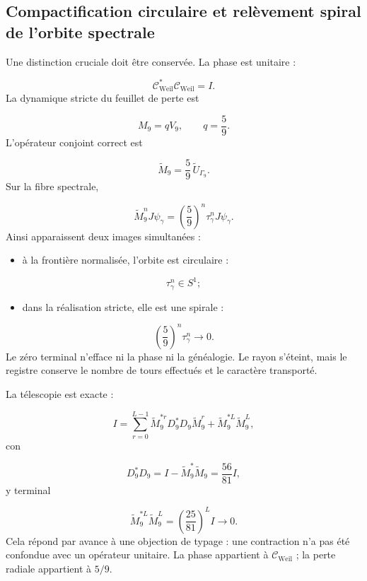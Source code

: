 \subsection{Compactification circulaire et relèvement spiral de l'orbite spectrale}
Une distinction cruciale doit être conservée. La phase est unitaire :\par
\[
\mathcal C_{\mathrm{Weil}}^*
\mathcal C_{\mathrm{Weil}}=I.
\]
La dynamique stricte du feuillet de perte est\par
\[
M_9=qV_9,
\qquad
q=\frac59.
\]
L'opérateur conjoint correct est\par
\[
\widetilde M_9
=
\frac59\,\widetilde U_{\Gamma_9}.
\]
Sur la fibre spectrale,\par
\[
\widetilde M_9^nJ\psi_\gamma
=
\left(\frac59\right)^n
\tau_\gamma^n
J\psi_\gamma.
\]
Ainsi apparaissent deux images simultanées :\par
\begin{itemize}
\item à la frontière normalisée, l'orbite est circulaire :
\end{itemize}
  \[
  \tau_\gamma^n\in S^1;
  \]
\begin{itemize}
\item dans la réalisation stricte, elle est une spirale :
\end{itemize}
  \[
  \left(\frac59\right)^n\tau_\gamma^n\longrightarrow0.
  \]
Le zéro terminal n'efface ni la phase ni la généalogie. Le rayon s'éteint, mais le registre conserve le nombre de tours effectués et le caractère transporté.\par
La télescopie est exacte :\par
\[
I
=
\sum_{r=0}^{L-1}
\widetilde M_9^{*r}
D_9^*D_9
\widetilde M_9^r
+
\widetilde M_9^{*L}\widetilde M_9^L,
\]
con\par
\[
D_9^*D_9
=
I-\widetilde M_9^*\widetilde M_9
=
\frac{56}{81}I,
\]
y terminal\par
\[
\widetilde M_9^{*L}\widetilde M_9^L
=
\left(\frac{25}{81}\right)^LI
\longrightarrow0.
\]
Cela répond par avance à une objection de typage : une contraction n'a pas été confondue avec un opérateur unitaire. La phase appartient à \(\mathcal C_{\mathrm{Weil}}\) ; la perte radiale appartient à \(5/9\).\par
{}
